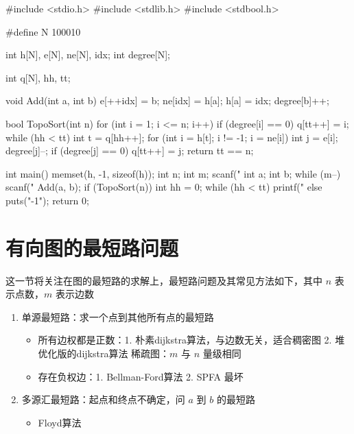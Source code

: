 \begin{mycpptwocol}[拓扑排序]
    #include <stdio.h>
    #include <stdlib.h>
    #include <stdbool.h>

    #define N 100010

    int h[N], e[N], ne[N], idx;
    int degree[N];

    int q[N], hh, tt;

    void Add(int a, int b) {
        e[++idx] = b;
        ne[idx] = h[a];
        h[a] = idx;
        degree[b]++;
    }

    bool TopoSort(int n) {
        for (int i = 1; i <= n; i++) {
            if (degree[i] == 0) {
                q[tt++] = i;
            }
        }
        while (hh < tt) {
            int t = q[hh++];
            for (int i = h[t]; i != -1; i = ne[i]) {
                int j = e[i];
                degree[j]--;
                if (degree[j] == 0) {
                    q[tt++] = j;
                }
            }
        }
        return tt == n;
    }

    int main()
        {
        memset(h, -1, sizeof(h));
        int n;
        int m;
        scanf("%
        int a;
        int b;
        while (m--) {
            scanf("%
            Add(a, b);
        }
        if (TopoSort(n)) {
            int hh = 0;
            while (hh < tt) {
                printf("%
            }
        } else {
            puts("-1");
        }
        return 0;
    }
\end{mycpptwocol}


\section{有向图的最短路问题}
这一节将关注在图的最短路的求解上，最短路问题及其常见方法如下，其中 $n$ 表示点数，$m$ 表示边数

\begin{enumerate}
    \item 单源最短路：求一个点到其他所有点的最短路
    \begin{itemize}
        \item 所有边权都是正数：1. 朴素dijkstra算法，与边数无关，适合稠密图 2. 堆优化版的dijkstra算法  稀疏图：$m$ 与 $n$ 量级相同
        \item 存在负权边：1. Bellman-Ford算法  2. SPFA 最坏 
    \end{itemize}
    \item 多源汇最短路：起点和终点不确定，问 $a$ 到 $b$ 的最短路
    \begin{itemize}
        \item Floyd算法 
    \end{itemize}
\end{enumerate}

